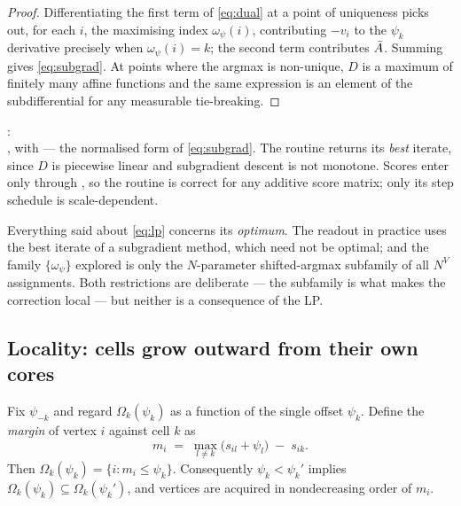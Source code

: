 \documentclass[11pt,a4paper]{article}
\begin{document}
\begin{proof}
Differentiating the first term of \eqref{eq:dual} at a point of uniqueness picks
out, for each $i$, the maximising index $\omega_\psi(i)$, contributing $-v_i$ to
the $\psi_k$ derivative precisely when $\omega_\psi(i) = k$; the second term
contributes $\bar{A}$. Summing gives \eqref{eq:subgrad}. At points where the argmax
is non-unique, $D$ is a maximum of finitely many affine functions and the same
expression is an element of the subdifferential for any measurable tie-breaking.
\end{proof}

\begin{tcolorbox}[colback=blue!4!white, colframe=blue!40!black,
                  title={Code: dual ascent on the offsets}, fontupper=\small]
: \\[2pt]
, with
 --- the normalised form of
\eqref{eq:subgrad}. The routine returns its \emph{best} iterate, since $D$ is
piecewise linear and subgradient descent is not monotone. Scores enter only
through , so the routine is correct for any additive
score matrix; only its step schedule is scale-dependent.
\end{tcolorbox}

\begin{remark}
Everything said about \eqref{eq:lp} concerns its \emph{optimum}. The readout in
practice uses the best iterate of a subgradient method, which need not be optimal;
and the family $\{\omega_\psi\}$ explored is only the $N$-parameter
shifted-argmax subfamily of all $N^V$ assignments. Both restrictions are
deliberate --- the subfamily is what makes the correction local --- but neither is
a consequence of the LP.
\end{remark}

\subsection{Locality: cells grow outward from their own cores}
\label{sec:locality}

\begin{prop}
\label{prop:nested}
Fix $\psi_{-k}$ and regard $\Omega_k(\psi_k)$ as a function of the single offset
$\psi_k$. Define the \emph{margin} of vertex $i$ against cell $k$ as
\begin{equation}
  m_i \;=\; \max_{l \neq k} \big( s_{il} + \psi_l \big) \;-\; s_{ik} .
  \label{eq:margin}
\end{equation}
Then $\Omega_k(\psi_k) = \{ i : m_i \le \psi_k \}$. Consequently
$\psi_k < \psi_k'$ implies $\Omega_k(\psi_k) \subseteq \Omega_k(\psi_k')$, and
vertices are acquired in nondecreasing order of $m_i$.
\end{prop}
\end{document}
